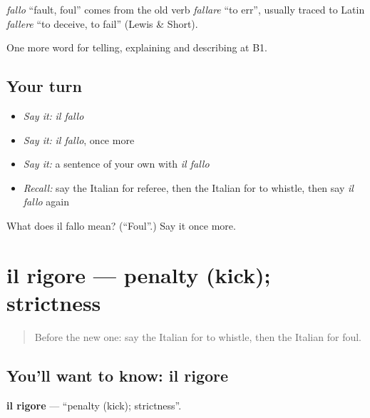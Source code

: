 \begin{cousinweb}
\emph{fallo} \textquotedblleft{}fault, foul\textquotedblright{} comes from the old verb \emph{fallare} \textquotedblleft{}to err\textquotedblright{}, usually traced to Latin \emph{fallere} \textquotedblleft{}to deceive, to fail\textquotedblright{} (Lewis \& Short).
\end{cousinweb}

\begin{grammarlens}[title={What you've built}]
One more word for telling, explaining and describing at B1.
\end{grammarlens}

\subsection*{Your turn}
\begin{itemize}
\raggedright
  \item \emph{Say it:} \emph{il fallo}
  \item \emph{Say it:} \emph{il fallo}, once more
  \item \emph{Say it:} a sentence of your own with \emph{il fallo}
  \item \emph{Recall:} say the Italian for referee, then the Italian for to whistle, then say \emph{il fallo} again
\end{itemize}

\begin{tcolorbox}[breakable,colback=teal!4,colframe=teal!35!black,title={Before you move on}]
What does il fallo mean? (\textquotedblleft{}Foul\textquotedblright{}.) Say it once more.
\end{tcolorbox}
\section[il rigore]{il rigore — penalty (kick); strictness}

\label{lesson:IT-C509-rigore}



\begin{quote}
Before the new one: say the Italian for to whistle, then the Italian for foul.
\end{quote}

\subsection*{You'll want to know: il rigore}
\textbf{il rigore} — \textquotedblleft{}penalty (kick); strictness\textquotedblright{}.

